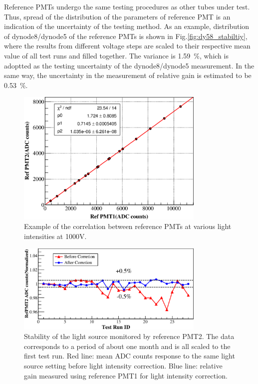 \documentclass[5p, times]{elsarticle}
\begin{document}
Reference PMTs undergo the same testing procedures as other tubes under test.
Thus, spread of the distribution of the parameters of reference PMT is an indication of the uncertainty of the testing method.
As an example, distribution of dynode8/dynode5 of the reference PMTs is shown in Fig.\ref{fig:dy58_stabiltiy}, where the results from different voltage steps are scaled to their respective mean value of all test runs and filled together.
The variance is \SI{1.59}{\percent}, which is adoptted as the testing uncertainty of the dynode8/dynode5 measurement.
In the same way, the uncertainty in the measurement of relative gain is estimated to be \SI{0.53}{\percent}. 

\begin{figure}[h!]
 \centering
 \includegraphics[width=90mm]{RelativeGainRef}
\caption{Example of the correlation between reference PMTs at various light intensities at 1000V.}
\label{fig:refgain_relation}
\end{figure} 

\begin{figure}[h!]
 \centering
 \includegraphics[width=90mm]{led_stability}
\caption{Stability of the light source monitored by reference PMT2.
The data corresponds to a period of about one month and is all scaled to the first test run.
Red line: mean ADC counts response to the same light source setting before light intensity correction.
Blue line: relative gain measured using reference PMT1 for light intensity correction.}
\label{fig:led_stability}
\end{figure} 
\end{document}
